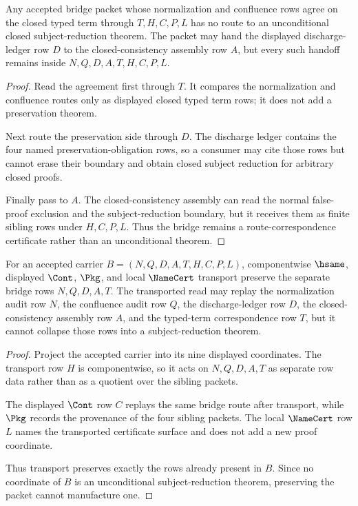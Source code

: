 \begin{theorem}
\label{thm:metacic-normalization-confluence-bridge-route-boundary}
Any accepted bridge packet whose normalization and confluence rows agree on the closed typed term through $T,H,C,P,L$ has no route to an unconditional closed subject-reduction theorem. The packet may hand the displayed discharge-ledger row $D$ to the closed-consistency assembly row $A$, but every such handoff remains inside $N,Q,D,A,T,H,C,P,L$.
\end{theorem}
\begin{proof}
Read the agreement first through $T$. It compares the normalization and confluence routes only as displayed closed typed term rows; it does not add a preservation theorem.

Next route the preservation side through $D$. The discharge ledger contains the four named preservation-obligation rows, so a consumer may cite those rows but cannot erase their boundary and obtain closed subject reduction for arbitrary closed proofs.

Finally pass to $A$. The closed-consistency assembly can read the normal false-proof exclusion and the subject-reduction boundary, but it receives them as finite sibling rows under $H,C,P,L$. Thus the bridge remains a route-correspondence certificate rather than an unconditional theorem.
\end{proof}

\begin{theorem}
\label{thm:metacic-normalization-confluence-bridge-transport-obligations}
For an accepted \MetacicNormalizationConfluenceBridgeUp{} carrier $B=(N,Q,D,A,T,H,C,P,L)$, componentwise $\hsame$, displayed $\Cont$, $\Pkg$, and local $\NameCert$ transport preserve the separate bridge rows $N,Q,D,A,T$. The transported read may replay the normalization audit row $N$, the confluence audit row $Q$, the discharge-ledger row $D$, the closed-consistency assembly row $A$, and the typed-term correspondence row $T$, but it cannot collapse those rows into a subject-reduction theorem.
\end{theorem}
\begin{proof}
Project the accepted carrier into its nine displayed coordinates. The transport row $H$ is componentwise, so it acts on $N,Q,D,A,T$ as separate row data rather than as a quotient over the sibling packets.

The displayed $\Cont$ row $C$ replays the same bridge route after transport, while $\Pkg$ records the provenance of the four sibling packets. The local $\NameCert$ row $L$ names the transported certificate surface and does not add a new proof coordinate.

Thus transport preserves exactly the rows already present in $B$. Since no coordinate of $B$ is an unconditional subject-reduction theorem, preserving the packet cannot manufacture one.
\end{proof}

